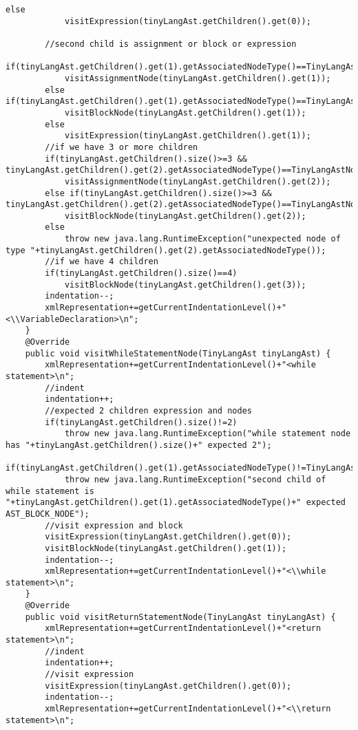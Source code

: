 \begin{lstlisting}[basicstyle=\miniscule,caption=Generating an XML representation of AST,label=listing:xmlGeneration]
		else 
			visitExpression(tinyLangAst.getChildren().get(0));
		
		//second child is assignment or block or expression
		if(tinyLangAst.getChildren().get(1).getAssociatedNodeType()==TinyLangAstNodes.AST_ASSIGNMENT_NODE)
			visitAssignmentNode(tinyLangAst.getChildren().get(1));
		else if(tinyLangAst.getChildren().get(1).getAssociatedNodeType()==TinyLangAstNodes.AST_BLOCK_NODE)
			visitBlockNode(tinyLangAst.getChildren().get(1));
		else 
			visitExpression(tinyLangAst.getChildren().get(1));
		//if we have 3 or more children 
		if(tinyLangAst.getChildren().size()>=3 && tinyLangAst.getChildren().get(2).getAssociatedNodeType()==TinyLangAstNodes.AST_ASSIGNMENT_NODE)
			visitAssignmentNode(tinyLangAst.getChildren().get(2));
		else if(tinyLangAst.getChildren().size()>=3 && tinyLangAst.getChildren().get(2).getAssociatedNodeType()==TinyLangAstNodes.AST_BLOCK_NODE)
			visitBlockNode(tinyLangAst.getChildren().get(2));
		else
			throw new java.lang.RuntimeException("unexpected node of type "+tinyLangAst.getChildren().get(2).getAssociatedNodeType());
		//if we have 4 children
		if(tinyLangAst.getChildren().size()==4) 
			visitBlockNode(tinyLangAst.getChildren().get(3));
		indentation--;
		xmlRepresentation+=getCurrentIndentationLevel()+"<\\VariableDeclaration>\n";			
	}
	@Override
	public void visitWhileStatementNode(TinyLangAst tinyLangAst) {
		xmlRepresentation+=getCurrentIndentationLevel()+"<while statement>\n";
		//indent
		indentation++;
		//expected 2 children expression and nodes
		if(tinyLangAst.getChildren().size()!=2)
			throw new java.lang.RuntimeException("while statement node has "+tinyLangAst.getChildren().size()+" expected 2");
		if(tinyLangAst.getChildren().get(1).getAssociatedNodeType()!=TinyLangAstNodes.AST_BLOCK_NODE)
			throw new java.lang.RuntimeException("second child of while statement is "+tinyLangAst.getChildren().get(1).getAssociatedNodeType()+" expected AST_BLOCK_NODE");
		//visit expression and block
		visitExpression(tinyLangAst.getChildren().get(0));
		visitBlockNode(tinyLangAst.getChildren().get(1));
		indentation--;
		xmlRepresentation+=getCurrentIndentationLevel()+"<\\while statement>\n";			
	}
	@Override
	public void visitReturnStatementNode(TinyLangAst tinyLangAst) {
		xmlRepresentation+=getCurrentIndentationLevel()+"<return statement>\n";
		//indent
		indentation++;
		//visit expression
		visitExpression(tinyLangAst.getChildren().get(0));
		indentation--;
		xmlRepresentation+=getCurrentIndentationLevel()+"<\\return statement>\n";			

\end{lstlisting}

